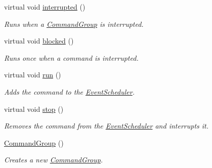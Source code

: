 \begin{DoxyCompactItemize}
virtual void \mbox{\hyperlink{classlib_iterative_robot_1_1_command_group_a5174a8e63675bead12b84e39df0ae90e}{interrupted}} ()
\begin{DoxyCompactList}\small\item\em Runs when a \mbox{\hyperlink{classlib_iterative_robot_1_1_command_group}{Command\+Group}} is interrupted. \end{DoxyCompactList}\item 
\mbox{\label{classlib_iterative_robot_1_1_command_group_a399576549aa44d14676eeb97939d857e}} 
virtual void \mbox{\hyperlink{classlib_iterative_robot_1_1_command_group_a399576549aa44d14676eeb97939d857e}{blocked}} ()
\begin{DoxyCompactList}\small\item\em Runs once when a command is interrupted. \end{DoxyCompactList}\item 
\mbox{\label{classlib_iterative_robot_1_1_command_group_a9e76c6d0ef039eca4dc27dd2f0144485}} 
virtual void \mbox{\hyperlink{classlib_iterative_robot_1_1_command_group_a9e76c6d0ef039eca4dc27dd2f0144485}{run}} ()
\begin{DoxyCompactList}\small\item\em Adds the command to the \mbox{\hyperlink{classlib_iterative_robot_1_1_event_scheduler}{Event\+Scheduler}}. \end{DoxyCompactList}\item 
\mbox{\label{classlib_iterative_robot_1_1_command_group_ad521849c9a7f1b3f952b318ee424c5b9}} 
virtual void \mbox{\hyperlink{classlib_iterative_robot_1_1_command_group_ad521849c9a7f1b3f952b318ee424c5b9}{stop}} ()
\begin{DoxyCompactList}\small\item\em Removes the command from the \mbox{\hyperlink{classlib_iterative_robot_1_1_event_scheduler}{Event\+Scheduler}} and interrupts it. \end{DoxyCompactList}\item 
\mbox{\hyperlink{classlib_iterative_robot_1_1_command_group_a862143e691209986739c234cb0fc4cc8}{Command\+Group}} ()
\begin{DoxyCompactList}\small\item\em Creates a new \mbox{\hyperlink{classlib_iterative_robot_1_1_command_group}{Command\+Group}}. \end{DoxyCompactList}\end{DoxyCompactItemize}
